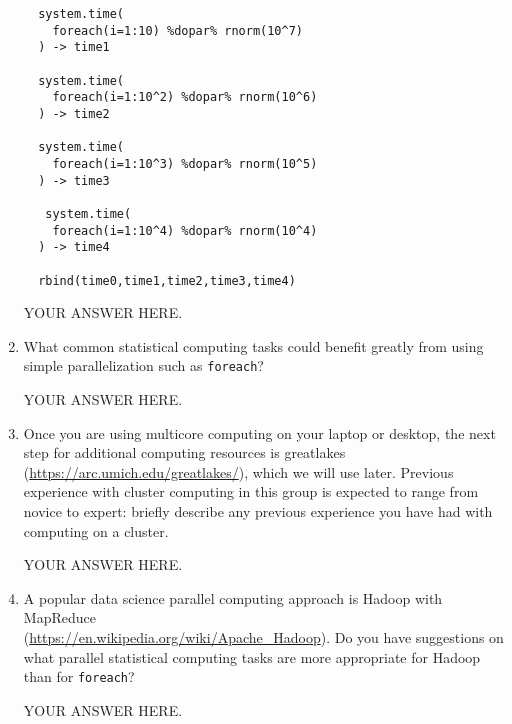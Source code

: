 \documentclass[12pt]{article}
\begin{document}
\begin{enumerate}
\begin{verbatim}
  system.time(
    foreach(i=1:10) %dopar% rnorm(10^7)
  ) -> time1

  system.time(
    foreach(i=1:10^2) %dopar% rnorm(10^6)
  ) -> time2

  system.time(
    foreach(i=1:10^3) %dopar% rnorm(10^5)
  ) -> time3

   system.time(
    foreach(i=1:10^4) %dopar% rnorm(10^4)
  ) -> time4
  
  rbind(time0,time1,time2,time3,time4)
\end{verbatim}

  YOUR ANSWER HERE.

\item What common statistical computing tasks could benefit greatly from using simple parallelization such as \texttt{foreach}?
  
YOUR ANSWER HERE.

\item Once you are using multicore computing on your laptop or desktop, the next step for additional computing resources is greatlakes (\url{https://arc.umich.edu/greatlakes/}), which we will use later. Previous experience with cluster computing in this group is expected to range from novice to expert: briefly describe any previous experience you have had with computing on a cluster.

  YOUR ANSWER HERE.

\item A popular data science parallel computing approach is Hadoop with MapReduce\\
(\url{https://en.wikipedia.org/wiki/Apache_Hadoop}). Do you have suggestions on what parallel statistical computing tasks are more appropriate for Hadoop than for \texttt{foreach}?

  YOUR ANSWER HERE.
  
\end{enumerate}
\end{document}
